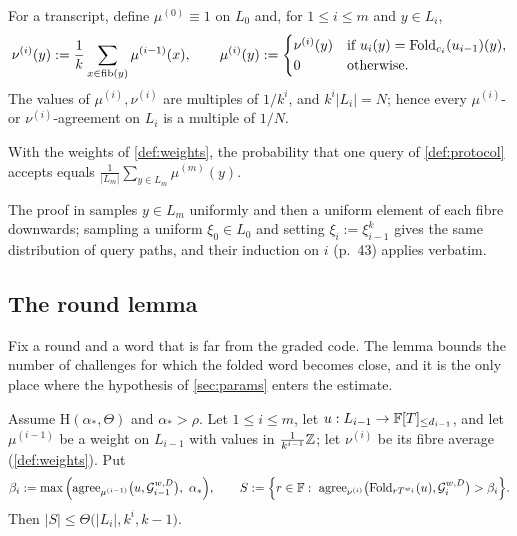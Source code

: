\begin{definition}\label{def:weights}
For a transcript, define $\mu^{(0)}\equiv1$ on $L_0$ and, for $1\le i\le m$ and $y\in L_i$,
\[
\nu^{(i)}(y):=\frac1k\sum_{x\in\mathrm{fib}(y)}\mu^{(i-1)}(x),\qquad
\mu^{(i)}(y):=\begin{cases}\nu^{(i)}(y)&\text{if }u_i(y)=\mathrm{Fold}_{c_i}(u_{i-1})(y),\\0&\text{otherwise.}\end{cases}
\]
The values of $\mu^{(i)},\nu^{(i)}$ are multiples of $1/k^i$, and $k^i|L_i|=N$; hence every
$\mu^{(i)}$- or $\nu^{(i)}$-agreement on $L_i$ is a multiple of $1/N$.
\end{definition}

\begin{importedthm}\label{ext:claim85}
With the weights of \cref{def:weights}, the probability that one query of \cref{def:protocol}
accepts equals $\frac1{|L_m|}\sum_{y\in L_m}\mu^{(m)}(y)$.
\end{importedthm}

The proof in \cite{BCIKS20} samples $y\in L_m$ uniformly and then a uniform element of each fibre
downwards; sampling a uniform $\xi_0\in L_0$ and setting $\xi_i:=\xi_{i-1}^k$ gives the same
distribution of query paths, and their induction on $i$ (p.~43) applies verbatim.

\subsection{The round lemma}\label{sec:round}

Fix a round and a word that is far from the graded code. The lemma bounds the number of
challenges for which the folded word becomes close, and it is the only place where the hypothesis
of \cref{sec:params} enters the estimate.

\begin{lemma}\label{lem:round}
Assume $\mathrm H(\alpha_*,\Theta)$ and $\alpha_*>\rho$. Let $1\le i\le m$, let $u:L_{i-1}\to\mathbb{F}[T]_{\le d_{i-1}}$,
and let $\mu^{(i-1)}$ be a weight on $L_{i-1}$ with values in $\frac1{k^{i-1}}\mathbb{Z}$; let $\nu^{(i)}$
be its fibre average (\cref{def:weights}). Put
\[
\beta_i:=\max\Big(\agree_{\mu^{(i-1)}}\big(u,\Gc_{i-1}^{w,D}\big),\ \alpha_*\Big),\qquad
S:=\Big\{r\in\F:\ \agree_{\nu^{(i)}}\big(\Fold_{rT^{w_i}}(u),\Gc_i^{w,D}\big)>\beta_i\Big\}.
\]
Then $|S|\le\Theta\big(|L_i|,k^i,k-1\big)$.
\end{lemma}

